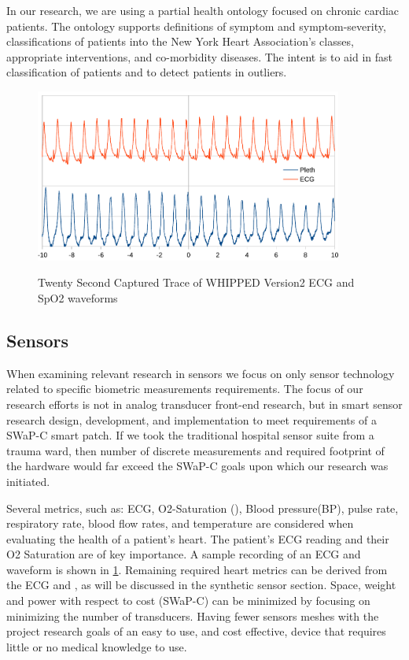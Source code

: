 In our research, we are using a partial health ontology focused on chronic cardiac patients. The ontology supports definitions of symptom and symptom-severity, classifications of patients into the New York Heart Association's classes, appropriate interventions, and co-morbidity diseases. The intent is to aid in fast classification of patients and to detect patients in outliers.


\begin{figure}
	\begin{center}
		\label{fig:20SecondEcg}
		\includegraphics[scale=1,width=0.9\textwidth]{Images/20second.pdf} 
		\caption{Twenty Second Captured Trace of WHIPPED Version2 ECG and SpO2 waveforms}
	\end{center}
\end{figure}


\subsection{Sensors}
\label{subsec:Sensors}
When examining relevant research in sensors we focus on only sensor technology related to specific biometric measurements requirements. The focus of our research efforts is not in analog transducer front-end research, but in smart sensor research design, development, and implementation to meet requirements of a SWaP-C smart patch. If we took the traditional hospital sensor suite from a trauma ward, then number of discrete measurements and required footprint of the hardware would far exceed the SWaP-C goals upon which our research was initiated.

Several metrics, such as: ECG, O2-Saturation (), Blood pressure(BP), pulse rate, respiratory rate, blood flow rates, and temperature are considered when evaluating the health of a patient's heart. The patient's ECG reading and their O2 Saturation are of key importance. A sample recording of an ECG and  waveform is shown in \ref{fig:20SecondEcg}. Remaining required heart metrics can be derived from the ECG and , as will be discussed in the synthetic sensor section. Space, weight and power with respect to cost (SWaP-C) can be minimized by focusing on minimizing the number of transducers. Having fewer sensors meshes with the project research goals of an easy to use, and cost effective, device that requires little or no medical knowledge to use.

